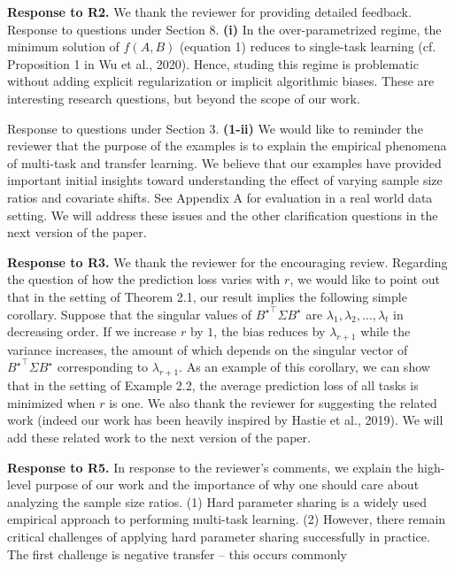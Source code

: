 \documentclass{article}
\begin{document}
	\textbf{Response to R2.} We thank the reviewer for providing detailed feedback.
	Response to questions under Section 8.
	\textbf{(i)}
	In the over-parametrized regime, the minimum solution of $f(A ,B)$ (equation 1) reduces to single-task learning  (cf. Proposition 1 in Wu et al., 2020).
	Hence, studing this regime is problematic without adding explicit regularization or implicit algorithmic biases.
	These are interesting research questions, but beyond the scope of our work.

	Response to questions under Section 3.
	\textbf{(1-ii)} We would like to reminder the reviewer that the purpose of the examples is to explain the empirical phenomena of multi-task and transfer learning.
	We believe that our examples have provided important initial insights toward understanding the effect of varying sample size ratios and covariate shifts.
	See Appendix A for evaluation in a real world data setting.
	We will address these issues and the other clarification questions in the next version of the paper.

	\textbf{Response to R3.}
	We thank the reviewer for the encouraging review.
	Regarding the question of how the prediction loss varies with $r$, we would like to point out that in the setting of Theorem 2.1, our result implies the following simple corollary.
	Suppose that the singular values of ${B^{\star}}^{\top}\Sigma B^{\star}$ are $\lambda_1, \lambda_2, \dots, \lambda_t$ in decreasing order.
	If we increase $r$ by $1$, the bias reduces by $\lambda_{r+1}$ while the variance increases, the amount of which depends on the singular vector of  ${B^{\star}}^{\top}\Sigma B^{\star}$ corresponding to $\lambda_{r+1}$.
	As an example of this corollary, we can show that in the setting of Example 2.2, the average prediction loss of all tasks is minimized when $r$ is one.
	We also thank the reviewer for suggesting the related work (indeed our work has been heavily inspired by Hastie et al., 2019).
	We will add these related work to the next version of the paper.

	\textbf{Response to R5.}
	In response to the reviewer's comments, we explain the high-level purpose of our work and the importance of why one should care about analyzing the sample size ratios.
	(1) Hard parameter sharing is a widely used empirical approach to performing multi-task learning.
	(2) However, there remain critical challenges of applying hard parameter sharing successfully in practice.
	The first challenge is negative transfer -- this occurs commonly
\end{document}
